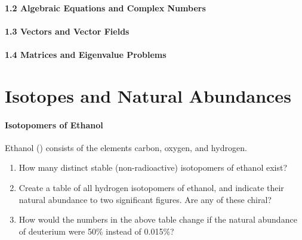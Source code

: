 \documentclass{chem6155problemset}
\begin{document}
\paragraph{1.2 Algebraic Equations and Complex Numbers}

\paragraph{1.3 Vectors and Vector Fields}

\paragraph{1.4 Matrices and Eigenvalue Problems}

\section{Isotopes and Natural Abundances}
\paragraph{Isotopomers of Ethanol}
	Ethanol () consists of the elements carbon, oxygen, and hydrogen.
	\begin{enumerate}
	\item How many distinct stable (non-radioactive) isotopomers of ethanol exist? 
	\item Create a table of all hydrogen isotopomers of ethanol, and indicate 
	their natural abundance to two significant figures. Are any of these chiral?
	\item How would the numbers in the above table change if the natural abundance
	of deuterium were 50\% instead of 0.015\%?
	\end{enumerate}

	
\end{document}
